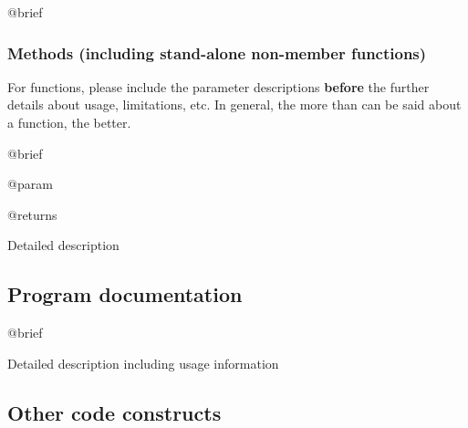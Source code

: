 \begin{DoxyItemize}
\item @brief
\end{DoxyItemize}\hypertarget{xpacc_documentation_guide_member_methods}{}\subsubsection{Methods (including stand-\/alone non-\/member functions)}\label{xpacc_documentation_guide_member_methods}
For functions, please include the parameter descriptions {\bfseries before} the further details about usage, limitations, etc. In general, the more than can be said about a function, the better.
\begin{DoxyItemize}
\item @brief
\item @param
\item @returns
\item Detailed description
\end{DoxyItemize}\hypertarget{xpacc_documentation_guide_program_sec}{}\subsection{Program documentation}\label{xpacc_documentation_guide_program_sec}

\begin{DoxyItemize}
\item @brief
\item Detailed description including usage information
\end{DoxyItemize}\hypertarget{xpacc_documentation_guide_other_sec}{}\subsection{Other code constructs}\label{xpacc_documentation_guide_other_sec}

